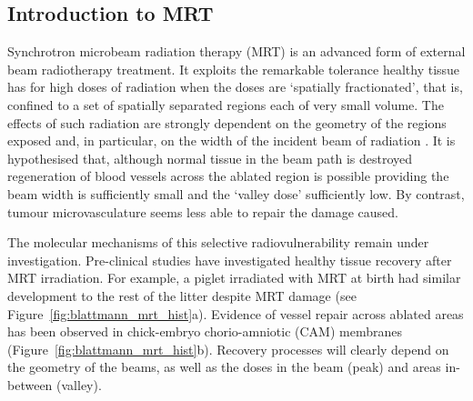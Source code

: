 	\subsection{Introduction to MRT}
	Synchrotron microbeam radiation therapy (MRT) is an advanced form of external beam radiotherapy treatment. It exploits the remarkable tolerance healthy tissue has for high doses of radiation when the doses are `spatially fractionated', that is, confined to a set of spatially separated regions each of very small volume. The effects of such radiation are strongly dependent on the geometry of the regions exposed and, in particular, on the width of the incident beam of radiation \cite{brauer-krischeffects2010}. It is hypothesised that, although normal tissue in the beam path is destroyed regeneration of blood vessels across the ablated region is possible providing the beam width is sufficiently small and the `valley dose' sufficiently low. By contrast, tumour microvasculature seems less able to repair the damage caused. 
	
	
	
	The molecular mechanisms of this selective radiovulnerability remain under investigation. Pre-clinical studies have investigated healthy tissue recovery after MRT irradiation. For example, a piglet irradiated with MRT at birth had similar development to the rest of the litter despite MRT damage (see Figure~\ref{fig:blattmann_mrt_hist}a). Evidence of vessel repair across ablated areas has been observed in  chick-embryo chorio-amniotic (CAM) membranes (Figure~\ref{fig:blattmann_mrt_hist}b). 
	Recovery processes will clearly depend on the geometry of the beams, as well as the doses in the beam (peak) and areas in-between (valley).
	
